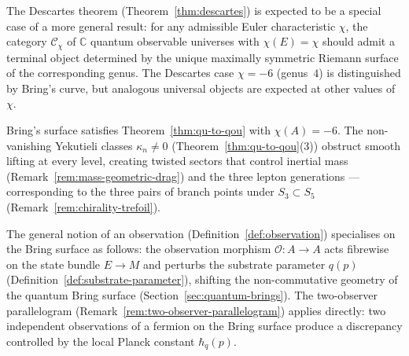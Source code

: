 \begin{remark}
\label{rem:universality-general}
The Descartes theorem (Theorem~\ref{thm:descartes}) is expected to be a
special case of a more general result: for any admissible Euler
characteristic $\chi$, the category $\mathcal{C}_{\chi}$ of $\mathbb{C}$
quantum observable universes with $\chi(E) = \chi$ should admit a terminal
object determined by the unique maximally symmetric Riemann surface of the
corresponding genus.  The Descartes case $\chi = -6$ (genus~$4$) is
distinguished by Bring's curve, but analogous universal objects are expected
at other values of~$\chi$.
\end{remark}

\begin{example}
\label{ex:descartes-yekutieli}
Bring's surface satisfies Theorem~\ref{thm:qu-to-qou} with
$\chi(A) = -6$.  The non-vanishing Yekutieli classes $\kappa_n \neq 0$
(Theorem~\ref{thm:qu-to-qou}(3)) obstruct smooth lifting at every level,
creating twisted sectors that control inertial mass
(Remark~\ref{rem:mass-geometric-drag}) and the three lepton generations
--- corresponding to the three pairs of branch points under
$S_3 \subset S_5$ (Remark~\ref{rem:chirality-trefoil}).
\end{example}

\begin{remark}
\label{rem:observation-brings}
The general notion of an observation
(Definition~\ref{def:observation}) specialises on the Bring surface as
follows: the observation morphism $\mathcal{O} \colon A \to A$ acts
fibrewise on the state bundle $E \to M$ and perturbs the substrate
parameter $q(p)$ (Definition~\ref{def:substrate-parameter}), shifting
the non-commutative geometry of the quantum Bring surface
(Section~\ref{sec:quantum-brings}).  The two-observer parallelogram
(Remark~\ref{rem:two-observer-parallelogram}) applies directly: two
independent observations of a fermion on the Bring surface produce a
discrepancy controlled by the local Planck constant $\hbar_q(p)$.
\end{remark}

